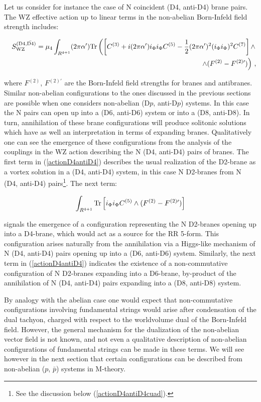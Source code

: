 \documentclass[12pt,a4paper]{article}
\begin{document}
Let us consider for instance the case of N coincident (D4, anti-D4)
brane pairs. The WZ effective
action up to linear terms in the non-abelian
Born-Infeld field strength includes:

\begin{eqnarray}
\label{actionD4antiD4}
&&S_{{\rm WZ}}^{{\rm (D4,\bar{D4})}}=\mu_4 \int_{R^{4+1}}
(2\pi\alpha^\prime){\rm Tr}\left(\left[C^{(3)}+
i(2\pi\alpha^\prime)i_\Phi i_\Phi
C^{(5)}-\frac12 (2\pi\alpha^\prime)^2 (i_\Phi i_\Phi)^2 
C^{(7)}\right]\wedge\right.\nonumber\\
&&\left.\wedge (F^{(2)}-F^{(2)\prime})\right)\, ,
\end{eqnarray}

\noindent where $F^{(2)}$, $F^{(2)\prime}$ are the Born-Infeld
field strengths for branes and antibranes.
Similar non-abelian configurations to the ones discussed in the
previous sections
are possible when one considers 
non-abelian (D$p$, anti-D$p$) systems. In this case the N pairs can 
open up into
a (D6, anti-D6) system or into a (D8, anti-D8). 
In turn, annihilation of these
brane configurations will produce solitonic solutions which have as
well an interpretation in terms of expanding branes. 
Qualitatively one can see the emergence of these configurations
from the analysis of the couplings in the WZ action describing the
N (D4, anti-D4) pairs of branes. The first term in (\ref{actionD4antiD4})
describes the usual realization of the D2-brane as a vortex solution
in a (D4, anti-D4) system, in this case N D2-branes from N (D4, anti-D4)
pairs\footnote{See the discussion below (\ref{actionD4antiD4cuad}).}.
The next term: 

\begin{equation}
\int_{R^{4+1}}{\rm Tr}\left[i_\Phi i_\Phi C^{(5)}\wedge (F^{(2)}-
F^{(2)\prime})\right]
\end{equation}

\noindent signals the emergence of a configuration representing the
N D2-branes opening up into a D4-brane, which would act as a source
for the RR 5-form. This configuration arises naturally from the 
annihilation via 
a Higgs-like mechanism of 
N (D4, anti-D4) pairs opening up into a (D6, anti-D6) system.
Similarly, the next term in (\ref{actionD4antiD4}) indicates the
existence of  
a non-commutative configuration of N D2-branes expanding into a
D6-brane, by-product of the annihilation of N (D4, anti-D4) pairs
expanding into a (D8, anti-D8) system. 

By analogy with the abelian case
one would expect that non-commutative configurations involving 
fundamental strings would arise after condensation of the
dual tachyon, charged with respect to the worldvolume dual of the
Born-Infeld field. However, the general mechanism for the dualization
of the non-abelian vector field is not known,
and not even a qualitative description
of non-abelian configurations of fundamental strings can be made
in these terms. We will see however in the next section that certain
configurations can be described from
non-abelian ($p$, ${\bar p}$) systems in M-theory.
\end{document}

